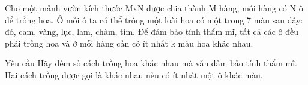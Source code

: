 Cho một mảnh vườn kích thước MxN được chia thành M hàng, mỗi hàng có N ô để trồng hoa. Ở mỗi ô ta có thể trồng một loài hoa có một trong 7 màu sau đây: đỏ, cam, vàng, lục, lam, chàm, tím. Để đảm bảo tính thẩm mĩ, tất cả các ô đều phải trồng hoa và ở mỗi hàng cần có ít nhất k màu hoa khác nhau.  

Yêu cầu
Hãy đếm số cách trồng hoa khác nhau mà vẫn đảm bảo tính thẩm mĩ. Hai cách trồng được gọi là khác nhau nếu có ít nhất một ô khác màu.